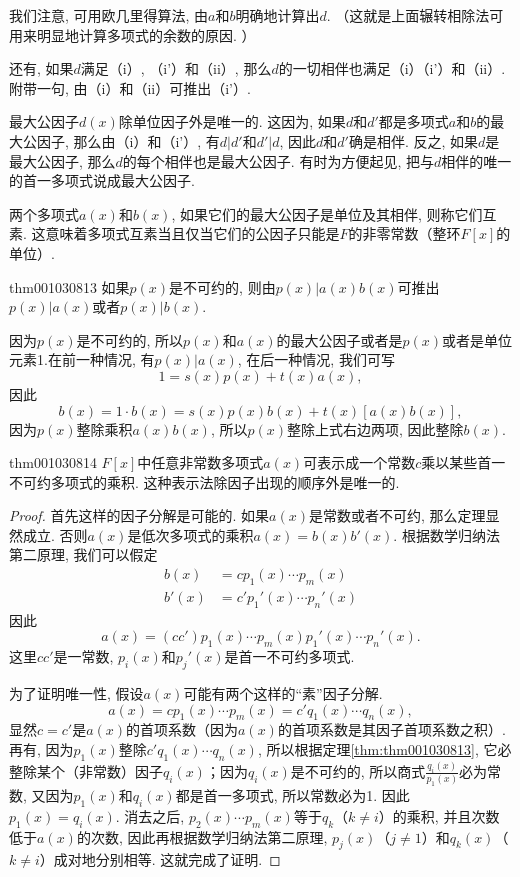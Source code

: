 我们注意, 可用欧几里得算法, 由$a$和$b$明确地计算出$d$. （这就是上面辗转相除法可用来明显地计算多项式的余数的原因. ）

还有, 如果$d$满足（i）, （i'）和（ii）, 那么$d$的一切相伴也满足（i）（i'）和（ii）. 附带一句, 由（i）和（ii）可推出（i'）. 

最大公因子$d(x)$除单位因子外是唯一的. 这因为, 如果$d$和$d'$都是多项式$a$和$b$的最大公因子, 那么由（i）和（i'）, 有$d|d'$和$d'|d$, 因此$d$和$d'$确是相伴. 反之, 如果$d$是最大公因子, 那么$d$的每个相伴也是最大公因子. 有时为方便起见, 把与$d$相伴的唯一的首一多项式说成最大公因子. 

两个多项式$a(x)$和$b(x)$, 如果它们的最大公因子是单位及其相伴, 则称它们互素. 这意味着多项式互素当且仅当它们的公因子只能是$F$的非零常数（整环$F[x]$的单位）. 

\begin{theorem}{}{thm001030813}
如果$p(x)$是不可约的, 则由$p(x)|a(x)b(x)$可推出$p(x)|a(x)$或者$p(x)|b(x)$. 
\end{theorem}

因为$p(x)$是不可约的, 所以$p(x)$和$a(x)$的最大公因子或者是$p(x)$或者是单位元素1.在前一种情况, 有$p(x)|a(x)$, 在后一种情况, 我们可写
\[
1 = s(x)p(x)+t(x)a(x),
\]
因此
\[
b(x)=1\cdot b(x) = s(x)p(x)b(x)+t(x)[a(x)b(x)],
\]
因为$p(x)$整除乘积$a(x)b(x)$, 所以$p(x)$整除上式右边两项, 因此整除$b(x)$. 

\begin{theorem}{}{thm001030814}
$F[x]$中任意非常数多项式$a(x)$可表示成一个常数$c$乘以某些首一不可约多项式的乘积. 这种表示法除因子出现的顺序外是唯一的. 
\end{theorem}

\begin{proof}
首先这样的因子分解是可能的. 如果$a(x)$是常数或者不可约, 那么定理显然成立. 否则$a(x)$是低次多项式的乘积$a(x)=b(x)b'(x)$. 根据数学归纳法第二原理, 我们可以假定
\[
\begin{aligned}
b(x)&=cp_1(x)\cdots p_m(x)\\
b'(x)&=c'p_1'(x)\cdots p_n'(x)
\end{aligned}
\]
因此
\[
a(x)=(cc')p_1(x)\cdots p_m(x)p_1'(x)\cdots p_n'(x).
\]
这里$cc'$是一常数, $p_i(x)$和$p_j'(x)$是首一不可约多项式. 


为了证明唯一性, 假设$a(x)$可能有两个这样的“素”因子分解. 
\[
a(x)=cp_1(x)\cdots p_m(x)=c'q_1(x) \cdots q_n(x),
\]
显然$c=c'$是$a(x)$的首项系数（因为$a(x)$的首项系数是其因子首项系数之积）. 再有, 因为$p_1(x)$整除$c'q_1(x)\cdots{}q_n(x)$, 所以根据定理\ref{thm:thm001030813}, 它必整除某个（非常数）因子$q_i(x)$；因为$q_i(x)$是不可约的, 所以商式$\frac{q_i(x)}{p_1(x)}$必为常数, 又因为$p_1(x)$和$q_i(x)$都是首一多项式, 所以常数必为1. 因此$p_1(x)=q_i(x)$. 消去之后, $p_2(x)\cdots p_m(x)$等于$q_k$（$k \neq i$）的乘积, 并且次数低于$a(x)$的次数, 因此再根据数学归纳法第二原理, $p_j(x)$（$j \neq 1$）和$q_k(x)$（$k \neq i$）成对地分别相等. 这就完成了证明. 
\end{proof}

